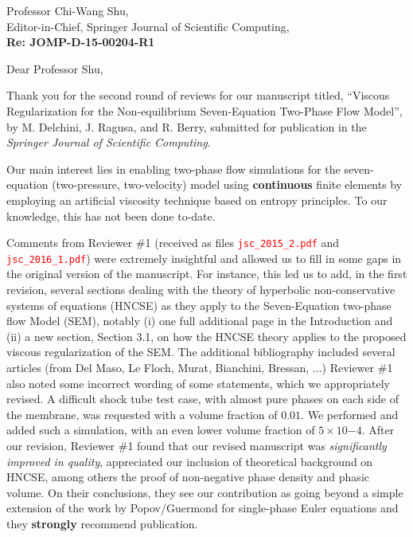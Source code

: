 \documentclass[11pt]{letter}
\newcommand{\tcr}[1]{\textcolor{red}{#1}}
\begin{document}
\begin{letter}{Professor Chi-Wang Shu, \\  Editor-in-Chief, Springer Journal of Scientific Computing,\\
\textbf{Re: JOMP-D-15-00204-R1}}


\date{\today}

\opening{Dear Professor Shu,}
         \vspace{0.25cm}

Thank you for the second round of reviews for our manuscript titled, 
``Viscous Regularization for the Non-equilibrium Seven-Equation Two-Phase Flow Model'',  
by M. Delchini, J. Ragusa, and R. Berry, submitted for publication in the {\it  Springer Journal of Scientific Computing}. 

Our main interest lies
in enabling two-phase flow simulations for the seven-equation (two-pressure, two-velocity) model using {\bf continuous}
finite elements by employing an artificial viscosity technique based on entropy principles. To our knowledge, this has 
not been done to-date.

Comments from Reviewer \#1 (received as files \tcr{{\tt jsc\_2015\_2.pdf}} and \tcr{{\tt jsc\_2016\_1.pdf}}) 
were extremely insightful and allowed
us to fill in some gaps in the original version of the manuscript. 
For instance, this led us to add, in the first revision, several sections
dealing with the theory of hyperbolic non-conservative systems of equations (HNCSE) as they apply to the 
Seven-Equation two-phase flow Model (SEM), notably (i) one full additional page in the Introduction and 
(ii) a new section, Section 3.1, on how the HNCSE theory applies to the proposed viscous regularization of the SEM.
The additional bibliography included several articles (from Del Maso, Le Floch, Murat, Bianchini, Bressan, ...) 
Reviewer \#1 also noted some incorrect wording of some statements, which we appropriately revised. A difficult shock 
tube test case, with almost pure phases on each side of the membrane, was requested with a volume fraction of $0.01$. We
performed and added such a simulation, with an even lower volume fraction of $5\times 10{-4}$. 
After our revision, Reviewer \#1 found that our revised manuscript was {\it significantly improved in quality}, appreciated our inclusion of
theoretical background on HNCSE, among others the proof of non-negative phase density and phasic volume.  On their
conclusions, they see our contribution as going beyond a simple extension of the work by Popov/Guermond for single-phase Euler equations and they {\bf strongly} recommend publication.


\end{letter}
\end{document}
